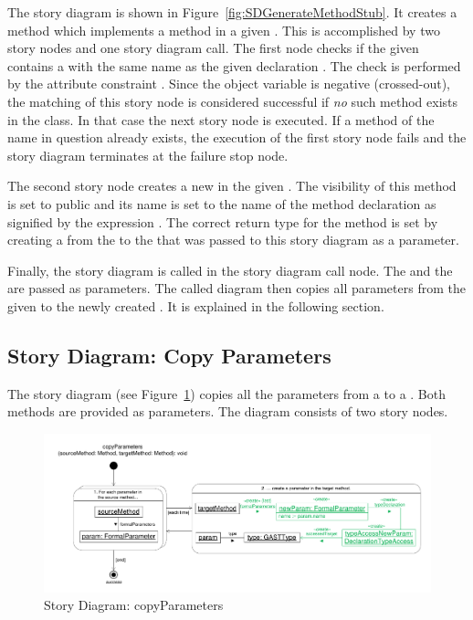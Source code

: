 The story diagram  is shown in Figure~\ref{fig:SDGenerateMethodStub}. It creates a method which implements a method  in a given . This is accomplished by two story nodes and one story diagram call. The first node checks if the given  contains a  with the same name as the given declaration . The check is performed by the attribute constraint . Since the object variable  is negative (crossed-out), the matching of this story node is considered successful if \emph{no} such method exists in the class. In that case the next story node is executed. If a method of the name in question already exists, the execution of the first story node fails and the story diagram terminates at the failure stop node.

The second story node creates a new  in the given . The visibility of this method is set to public and its name is set to the name of the method declaration as signified by the expression . The correct return type for the method is set by creating a  from the  to the  that was passed to this story diagram as a parameter.

Finally, the story diagram  is called in the story diagram call node. The  and the  are passed as parameters. The called diagram then copies all parameters from the given  to the newly created . It is explained in the following section.

\subsection{Story Diagram: Copy Parameters} \label{sec:SDCopyParameters}

The story diagram  (see Figure~\ref{fig:SDCopyParameters}) copies all the parameters from a  to a . Both methods are provided as parameters. The diagram consists of two story nodes.

\begin{figure}[hbtp]
\centering
\includegraphics[width=0.9\linewidth]{./figures/SDCopyParameters}
\caption{Story Diagram: copyParameters}
\label{fig:SDCopyParameters}
\end{figure}

